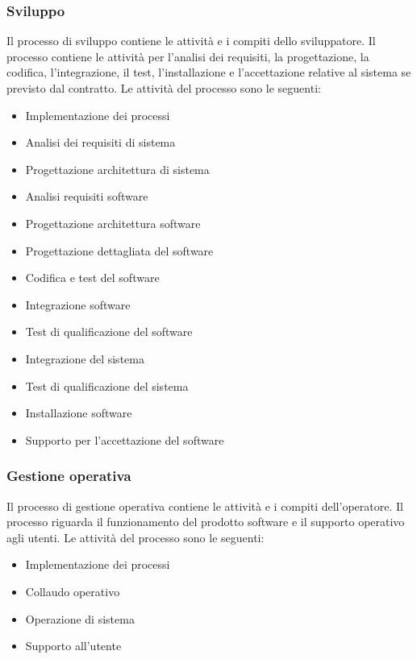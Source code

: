 \subsubsection{Sviluppo}
Il processo di sviluppo contiene le attività e i compiti dello sviluppatore.
Il processo contiene le attività per l'analisi dei requisiti, la progettazione, la codifica, l'integrazione, il test, l'installazione e l'accettazione relative al sistema se previsto dal contratto.
Le attività del processo sono le seguenti:
\begin{itemize}
\item Implementazione dei processi
\item Analisi dei requisiti di sistema
\item Progettazione architettura di sistema
\item Analisi requisiti software
\item Progettazione architettura software
\item Progettazione dettagliata del software
\item Codifica e test del software
\item Integrazione software
\item Test di qualificazione del software
\item Integrazione del sistema 
\item Test di qualificazione del sistema 
\item Installazione software
\item Supporto per l'accettazione del software
\end{itemize}

\subsubsection{Gestione operativa}
Il processo di gestione operativa contiene le attività e i compiti dell'operatore. Il processo riguarda il funzionamento del prodotto software e il supporto operativo agli utenti. 
Le attività del processo sono le seguenti:
\begin{itemize}
\item Implementazione dei processi
\item Collaudo operativo
\item Operazione di sistema
\item Supporto all'utente
\end{itemize}

